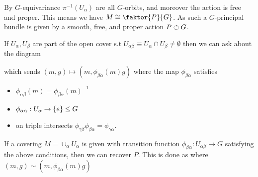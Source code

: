 \documentclass{article}
\begin{document}
\begin{remark}
By $G$-equivariance $\pi^{-1}(U_\alpha)$ are all $G$-orbits, and moreover the action is free and proper. This means we have $M \cong \faktor{P}{G}$. As such a $G$-principal bundle is given by a smooth, free, and proper action $P \circlearrowleft G$. 
\end{remark}

If $U_\alpha,U_\beta$ are part of the open cover s.t $U_{\alpha\beta} \equiv U_\alpha \cap U_\beta \neq \emptyset$ then we can ask about the diagram
\begin{center}
\end{center}

\begin{comment}
\begin{tkz}
\pi^{-1}(U_{\alpha\beta}) \arrow[r,"\Psi_\beta"] \arrow[d,"\Psi_\alpha"] & U_{\alpha\beta} \times G \\
U_{\alpha\beta}\times G \arrow[ur] & 
\end{tkz}
\end{comment}
which sends $(m,g) \mapsto (m,\phi_{\beta\alpha}(m)g)$ where the map $\phi_{\beta\alpha}$ satisfies 
\begin{itemize}
    \item $\phi_{\alpha\beta}(m) = \phi_{\beta\alpha}(m)^{-1}$ 
    \item $\phi_{\alpha\alpha} : U_\alpha \to \left\{ e \right\}\leq G $
    \item on triple intersects $\phi_{\gamma\beta}\phi_{\beta\alpha} = \phi_{\gamma\alpha}$. 
\end{itemize}

\begin{remark}
If a covering $M = \cup_\alpha U_\alpha$ is given with transition function $\phi_{\beta\alpha}:U_{\alpha\beta} \to G$ satisfying the above conditions, then we can recover $P$. This is done as 
where $(m,g) \sim (m, \phi_{\beta\alpha}(m) g)$
\end{remark}
\end{document}
